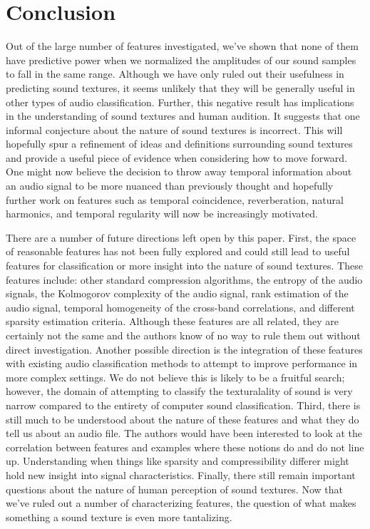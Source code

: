 \documentclass{sig-alternate-05-2015}
\begin{document}
\section{Conclusion}

Out of the large number of features investigated, we've shown that none of them have predictive power when we normalized the amplitudes of our sound samples to fall in the same range. Although we have only ruled out their usefulness in predicting sound textures, it seems unlikely that they will be generally useful in other types of audio classification. Further, this negative result has implications in the understanding of sound textures and human audition. It suggests that one informal conjecture about the nature of sound textures is incorrect. This will hopefully spur a refinement of ideas and definitions surrounding sound textures and provide a useful piece of evidence when considering how to move forward. One might now believe the decision to throw away temporal information about an audio signal to be more nuanced than previously thought and hopefully further work on features such as temporal coincidence, reverberation, natural harmonics, and temporal regularity will now be increasingly motivated.

There are a number of future directions left open by this paper. First, the space of reasonable features has not been fully explored and could still lead to useful features for classification or more insight into the nature of sound textures. These features include: other standard compression algorithms, the entropy of the audio signals, the Kolmogorov complexity of the audio signal, rank estimation of the audio signal, temporal homogeneity of the cross-band correlations, and different sparsity estimation criteria. Although these features are all related, they are certainly not the same and the authors know of no way to rule them out without direct investigation. Another possible direction is the integration of these features with existing audio classification methods to attempt to improve performance in more complex settings. We do not believe this is likely to be a fruitful search; however, the domain of attempting to classify the texturalality of sound is very narrow compared to the entirety of computer sound classification. Third, there is still much to be understood about the nature of these features and what they do tell us about an audio file. The authors would have been interested to look at the correlation between features and examples where these notions do and do not line up. Understanding when things like sparsity and compressibility differer might hold new insight into signal characteristics. Finally, there still remain important questions about the nature of human perception of sound textures. Now that we've ruled out a number of characterizing features, the question of what makes something a sound texture is even more tantalizing. 
\end{document}
